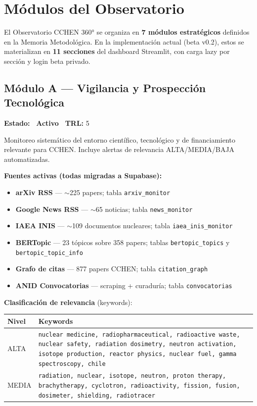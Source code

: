 \documentclass[12pt,a4paper]{report}
\newcommand{\badge}[2]{%
  \colorbox{#1}{\color{white}\small\textbf{\ #2\ }}%
}
\newcommand{\bactive}{\badge{cchengreen}{Activo}}
\begin{document}
\chapter{Módulos del Observatorio}

El Observatorio CCHEN 360° se organiza en \textbf{7 módulos estratégicos} definidos en la Memoria Metodológica. En la implementación actual (beta v0.2), estos se materializan en \textbf{11 secciones} del dashboard Streamlit, con carga lazy por sección y login beta privado.

\section{Módulo A --- Vigilancia y Prospección Tecnológica}
\textbf{Estado:} \bactive \quad \textbf{TRL:} 5

Monitoreo sistemático del entorno científico, tecnológico y de financiamiento relevante para CCHEN. Incluye alertas de relevancia ALTA/MEDIA/BAJA automatizadas.

\textbf{Fuentes activas (todas migradas a Supabase):}
\begin{itemize}
  \item \textbf{arXiv RSS} --- $\sim$225 papers; tabla \texttt{arxiv\_monitor}
  \item \textbf{Google News RSS} --- $\sim$65 noticias; tabla \texttt{news\_monitor}
  \item \textbf{IAEA INIS} --- $\sim$109 documentos nucleares; tabla \texttt{iaea\_inis\_monitor}
  \item \textbf{BERTopic} --- 23 tópicos sobre 358 papers; tablas \texttt{bertopic\_topics} y \texttt{bertopic\_topic\_info}
  \item \textbf{Grafo de citas} --- 877 papers CCHEN; tabla \texttt{citation\_graph}
  \item \textbf{ANID Convocatorias} --- scraping + curaduría; tabla \texttt{convocatorias}
\end{itemize}

\textbf{Clasificación de relevancia} (keywords):

\begin{tabular}{L{2.5cm} L{10cm}}
  \toprule
  \textbf{Nivel} & \textbf{Keywords} \\
  \midrule
  ALTA & \texttt{nuclear medicine, radiopharmaceutical, radioactive waste, nuclear safety, radiation dosimetry, neutron activation, isotope production, reactor physics, nuclear fuel, gamma spectroscopy, chile} \\
  \midrule
  MEDIA & \texttt{radiation, nuclear, isotope, neutron, proton therapy, brachytherapy, cyclotron, radioactivity, fission, fusion, dosimeter, shielding, radiotracer} \\
  \bottomrule
\end{tabular}
\end{document}
